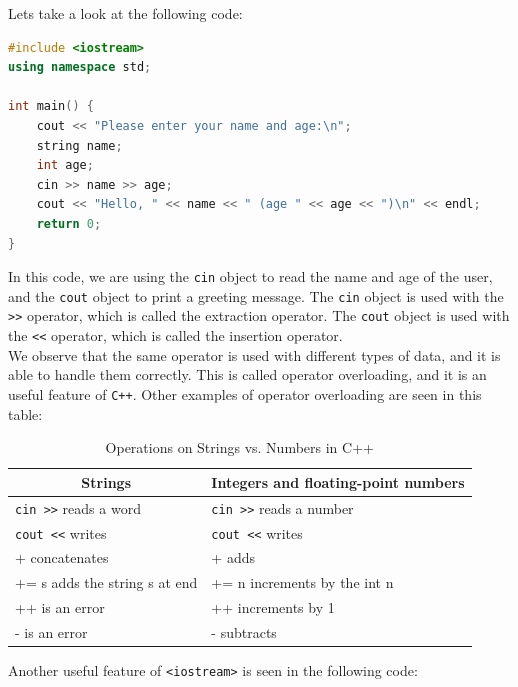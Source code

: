 Lets take a look at the following code:

\begin{lstlisting}[language=C++]
#include <iostream>
using namespace std;

int main() {
    cout << "Please enter your name and age:\n";
    string name;
    int age;
    cin >> name >> age;
    cout << "Hello, " << name << " (age " << age << ")\n" << endl;
    return 0;
}
\end{lstlisting}

In this code, we are using the \texttt{cin} object to read the name and age of the user, and the
\texttt{cout} object to print a greeting message. The \texttt{cin} object is used with the \texttt{>>}
operator, which is called the extraction operator. The \texttt{cout} object is used with the \texttt{<<}
operator, which is called the insertion operator.\\

We observe that the same operator is used with different types of data, and it is able to handle 
them correctly. This is called operator overloading, and it is an useful feature of \texttt{C++}. Other 
examples of operator overloading are seen in this table:\\

\begin{table}[ht]
    \centering
    \begin{tabular}{|l|l|}
    \hline
    \multicolumn{1}{|c|}{\textbf{Strings}} & \multicolumn{1}{c|}{\textbf{Integers and floating-point numbers}} \\
    \hline
    \texttt{cin >>} reads a word & \texttt{cin >>} reads a number \\
    \hline
    \texttt{cout <<} writes & \texttt{cout <<} writes \\
    \hline
    + concatenates & + adds \\
    \hline
    += s adds the string s at end & += n increments by the int n \\
    \hline
    ++ is an error & ++ increments by 1 \\
    \hline
    - is an error & - subtracts \\
    \hline
    \end{tabular}
    \caption{Operations on Strings vs. Numbers in C++}
    \label{tab:cpp_operations}
\end{table}

Another useful feature of \texttt{<iostream>} is seen in the following code:\\


